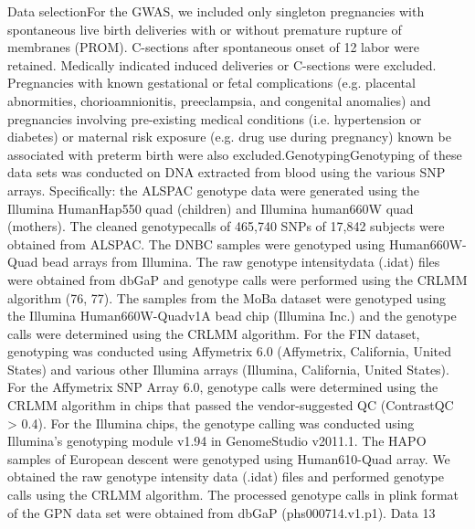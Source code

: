 Data selectionFor the GWAS, we included only singleton pregnancies with spontaneous live birth deliveries with or without premature rupture of membranes (PROM). C-sections after spontaneous onset of 12 labor were retained. Medically indicated induced deliveries or C-sections were excluded. Pregnancies with known gestational or fetal complications (e.g. placental abnormities, chorioamnionitis, preeclampsia, and congenital anomalies) and pregnancies involving pre-existing medical conditions (i.e. hypertension or diabetes) or maternal risk exposure (e.g. drug use during pregnancy) known be associated with preterm birth were also excluded.GenotypingGenotyping of these data sets was conducted on DNA extracted from blood using the various SNP arrays. Specifically: the ALSPAC genotype data were generated using the Illumina HumanHap550 quad (children) and Illumina human660W quad (mothers). The cleaned genotypecalls of 465,740 SNPs of 17,842 subjects were obtained from ALSPAC. The DNBC samples were genotyped using Human660W-Quad bead arrays from Illumina. The raw genotype intensitydata (.idat) files were obtained from dbGaP and genotype calls were performed using the CRLMM algorithm (76, 77). The samples from the MoBa dataset were genotyped using the Illumina Human660W-Quadv1A bead chip (Illumina Inc.) and the genotype calls were determined using the CRLMM algorithm. For the FIN dataset, genotyping was conducted using Affymetrix 6.0 (Affymetrix, California, United States) and various other Illumina arrays (Illumina, California, United States). For the Affymetrix SNP Array 6.0, genotype calls were determined using the CRLMM algorithm in chips that passed the vendor-suggested QC (ContrastQC > 0.4). For the Illumina chips, the genotype calling was conducted using Illumina’s genotyping module v1.94 in GenomeStudio v2011.1. The HAPO samples of European descent were genotyped using Human610-Quad array. We obtained the raw genotype intensity data (.idat) files and performed genotype calls using the CRLMM algorithm. The processed genotype calls in plink format of the GPN data set were obtained from dbGaP (phs000714.v1.p1). Data 13
